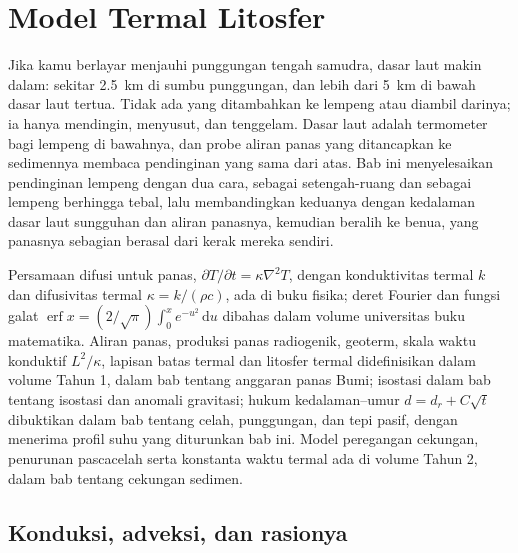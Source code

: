 \chapter{Model Termal Litosfer}\label{ch:b3:lithosphere-thermal-models}

Jika kamu berlayar menjauhi punggungan tengah samudra, dasar laut makin dalam: sekitar
\qty{2.5}{km} di sumbu punggungan, dan lebih dari \qty{5}{km} di bawah dasar
laut tertua. Tidak ada yang ditambahkan ke lempeng atau diambil darinya; ia hanya
mendingin, menyusut, dan tenggelam. Dasar laut adalah termometer bagi lempeng
di bawahnya, dan probe aliran panas yang ditancapkan ke sedimennya
membaca pendinginan yang sama dari atas. Bab ini menyelesaikan pendinginan lempeng dengan dua cara, sebagai
setengah-ruang dan sebagai lempeng berhingga tebal, lalu membandingkan keduanya dengan kedalaman
dasar laut sungguhan dan aliran panasnya, kemudian beralih ke benua,
yang panasnya sebagian berasal dari kerak mereka sendiri.

\begin{recall}
Persamaan difusi untuk panas, $\partial T/\partial t = \kappa\nabla^2T$,
dengan konduktivitas termal $k$ dan difusivitas termal $\kappa =
k/(\rho c)$, ada di buku fisika; deret Fourier dan fungsi galat
$\operatorname{erf}x = (2/\sqrt\pi)\int_0^xe^{-u^2}\,\mathrm du$ dibahas dalam
volume universitas buku matematika. Aliran panas, produksi panas
radiogenik, geoterm, skala waktu konduktif $L^2/\kappa$, lapisan
batas termal dan litosfer termal didefinisikan dalam volume Tahun 1,
dalam bab tentang anggaran panas Bumi; isostasi dalam bab tentang isostasi
dan anomali gravitasi; hukum kedalaman--umur $d = d_r + C\sqrt t$ dibuktikan dalam
bab tentang celah, punggungan, dan tepi pasif, dengan menerima profil suhu
yang diturunkan bab ini. Model peregangan cekungan, penurunan pascacelah
serta konstanta waktu termal ada di volume Tahun 2, dalam bab
tentang cekungan sedimen.
\end{recall}

\section{Konduksi, adveksi, dan rasionya}

